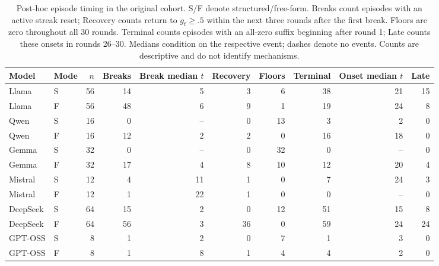 \begin{table}[t]
\centering\small
\setlength{\tabcolsep}{3pt}
\begin{tabular}{llrrrrrrrr}
\toprule
Model & Mode & $n$ & Breaks & \shortstack{Break\\median $t$} & Recovery & Floors & Terminal & \shortstack{Onset\\median $t$} & Late \\
\midrule
Llama & S & 56 & 14 & 5 & 3 & 6 & 38 & 21 & 15 \\
Llama & F & 56 & 48 & 6 & 9 & 1 & 19 & 24 & 8 \\
Qwen & S & 16 & 0 & -- & 0 & 13 & 3 & 2 & 0 \\
Qwen & F & 16 & 12 & 2 & 2 & 0 & 16 & 18 & 0 \\
Gemma & S & 32 & 0 & -- & 0 & 32 & 0 & -- & 0 \\
Gemma & F & 32 & 17 & 4 & 8 & 10 & 12 & 20 & 4 \\
Mistral & S & 12 & 4 & 11 & 1 & 0 & 7 & 24 & 3 \\
Mistral & F & 12 & 1 & 22 & 1 & 0 & 0 & -- & 0 \\
DeepSeek & S & 64 & 15 & 2 & 0 & 12 & 51 & 15 & 8 \\
DeepSeek & F & 64 & 56 & 3 & 36 & 0 & 59 & 24 & 24 \\
GPT-OSS & S & 8 & 1 & 2 & 0 & 7 & 1 & 3 & 0 \\
GPT-OSS & F & 8 & 1 & 8 & 1 & 4 & 4 & 2 & 0 \\
\bottomrule
\end{tabular}
\caption{Post-hoc episode timing in the original cohort. S/F denote structured/free-form. Breaks count episodes with an active streak reset; Recovery counts return to $g_t\geq.5$ within the next three rounds after the first break. Floors are zero throughout all 30 rounds. Terminal counts episodes with an all-zero suffix beginning after round 1; Late counts these onsets in rounds 26--30. Medians condition on the respective event; dashes denote no events. Counts are descriptive and do not identify mechanisms.}
\label{tab:log-timing}
\end{table}
